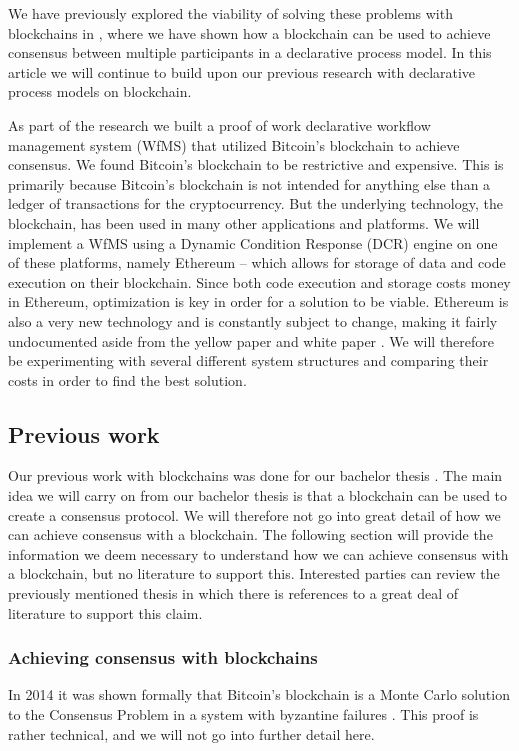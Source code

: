\documentclass{article}
\begin{document}
	We have previously explored the viability of solving these problems with blockchains in \cite{bachelor}, where we have shown how a blockchain can be used to achieve consensus between multiple participants in a declarative process model. 
	In this article we will continue to build upon our previous research with declarative process models on blockchain.

	As part of the research we built a proof of work declarative workflow management system (WfMS) that utilized Bitcoin's blockchain to achieve consensus. 
	We found Bitcoin's blockchain to be restrictive and expensive.
	This is primarily because Bitcoin's blockchain is not intended for anything else than a ledger of transactions for the cryptocurrency. 
	But the underlying technology, the blockchain, has been used in many other applications and platforms. 
	We will implement a WfMS using a Dynamic Condition Response (DCR) engine on one of these platforms, namely Ethereum -- which allows for storage of data and code execution on their blockchain.
	Since both code execution and storage costs money in Ethereum, optimization is key in order for a solution to be viable.
	Ethereum is also a very new technology and is constantly subject to change, making it fairly undocumented aside from the yellow paper \cite{yellow-paper} and white paper \cite{ethereum-white-paper}.
	We will therefore be experimenting with several different system structures and comparing their costs in order to find the best solution.

		\subsection{Previous work}
		Our previous work with blockchains was done for our bachelor thesis \cite{bachelor}. 
		The main idea we will carry on from our bachelor thesis is that a blockchain can be used to create a consensus protocol. 
		We will therefore not go into great detail of how we can achieve consensus with a blockchain. 
		The following section will provide the information we deem necessary to understand how we can achieve consensus with a blockchain, but no literature to support this. 
		Interested parties can review the previously mentioned thesis in which there is references to a great deal of literature to support this claim.

			\subsubsection{Achieving consensus with blockchains}
			In 2014 it was shown formally that Bitcoin's blockchain is a Monte Carlo solution to the Consensus Problem in a system with byzantine failures \cite{anonymous-byzantine-consensus}. 
			This proof is rather technical, and we will not go into further detail here.
\end{document}
